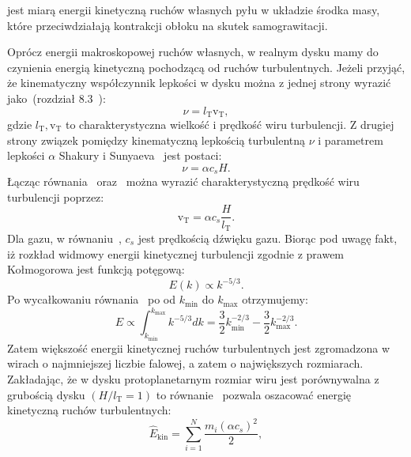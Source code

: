 jest miarą energii kinetyczną ruchów własnych pyłu w układzie środka masy, które
przeciwdziałają kontrakcji obłoku na skutek samograwitacji.  
\par Oprócz energii
makroskopowej ruchów własnych, w realnym dysku mamy do czynienia energią
kinetyczną pochodzącą od ruchów turbulentnych.  Jeżeli przyjąć, że kinematyczny
współczynnik lepkości w dysku można z jednej strony wyrazić jako~(rozdział
8.3~\cite{C98}):
%
\begin{equation}
   \nu = l_{\textrm{T}} \textrm{v}_{\textrm{T}},
   \label{eq:nu1}
\end{equation}
%
gdzie $l_{\textrm{T}}, \textrm{v}_{\textrm{T}}$ to charakterystyczna wielkość i prędkość
wiru turbulencji. Z drugiej strony 
związek pomiędzy kinematyczną lepkością turbulentną $\nu$ i parametrem lepkości
$\alpha$ Shakury i Sunyaeva~\cite{SS73} jest postaci:
%
\begin{equation}
   \nu = \alpha c_s H.
   \label{eq:nu2}
\end{equation}
%
Łącząc równania~ oraz~ można wyrazić charakterystyczną
prędkość wiru turbulencji poprzez:
%
\begin{equation}
   \textrm{v}_{\textrm{T}} = \alpha c_s \frac{H}{l_{\textrm{T}}}.
   \label{eq:velt}
\end{equation}
%
Dla gazu, w równaniu~, $c_s$ jest prędkością dźwięku gazu.
Biorąc pod uwagę fakt, iż rozkład widmowy energii kinetycznej turbulencji
zgodnie z prawem Kołmogorowa jest funkcją potęgową:
\begin{equation}
   E(k) \propto k^{-5/3}.
   \label{eq:ek}
\end{equation}
Po wycałkowaniu równania~ po od $k_\textrm{min}$ do $k_\textrm{max}$
otrzymujemy:
\begin{equation}
   E \propto \int_{k_\textrm{min}}^{k_\textrm{max}} k^{-5/3} dk = \frac{3}{2}
   k_\textrm{min}^{-2/3} -\frac{3}{2}k_\textrm{max}^{-2/3}.
\end{equation}
Zatem większość energii kinetycznej ruchów turbulentnych jest zgromadzona w wirach
o najmniejszej liczbie falowej, a zatem o największych rozmiarach. Zakładając,
że w dysku protoplanetarnym rozmiar wiru jest porównywalna z grubością dysku $(H
/ l_{\textrm{T}} = 1)$ to równanie~ pozwala oszacować energię 
kinetyczną ruchów turbulentnych:
\begin{equation}
   \hat{E}_{\textrm{kin}} = \sum\limits_{i=1}^N \frac{m_i \left(\alpha
   c_s\right)^2}{2},
   \label{eq:ekinturb}
\end{equation}
